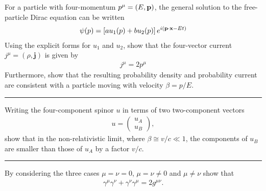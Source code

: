 
\begin{problem}{4.4}
For a particle with four-momentum $p^\mu = (E,\mathbf{p})$, the general solution to the free-particle Dirac equation can be written
\begin{align*}
    \psi(p) = \left[ au_1(p)+bu_2(p) \right] e^{i\left( \mathbf{p}\cdot\mathbf{x} - Et \right)}
\end{align*}
Using the explicit forms for $u_1$ and $u_2$, show that the four-vector current $j^\mu=(\rho,\mathbf{j})$ is given by
\begin{align*}
    j^\mu = 2 p^\mu
\end{align*}
Furthermore, show that the resulting probability density and probability current are consistent with a particle
moving with velocity $\beta = p /E$.
\end{problem}
\begin{solution}

\end{solution}

\noindent\rule{7in}{1.5pt}


\begin{problem}{4.5}
Writing the four-component spinor $u$ in terms of two two-component vectors
\begin{align*}
    u = \begin{pmatrix}
        u_A \\
        u_B
    \end{pmatrix},
\end{align*}
show that in the non-relativistic limit, where $\beta \cong v/c \ll 1$, the components of $u_B$ are smaller than those of $u_A$ by a factor $v/c$.
\end{problem}
\begin{solution}

\end{solution}

\noindent\rule{7in}{1.5pt}


\begin{problem}{4.6}
By considering the three cases $\mu=\nu=0$, $\mu=\nu\neq 0$ and $\mu \neq \nu$ show that 
\begin{align*}
    \gamma^\mu \gamma^\nu + \gamma^\nu \gamma^\mu = 2 g^{\mu\nu}.
\end{align*}
\end{problem}
\begin{solution}

\end{solution}

